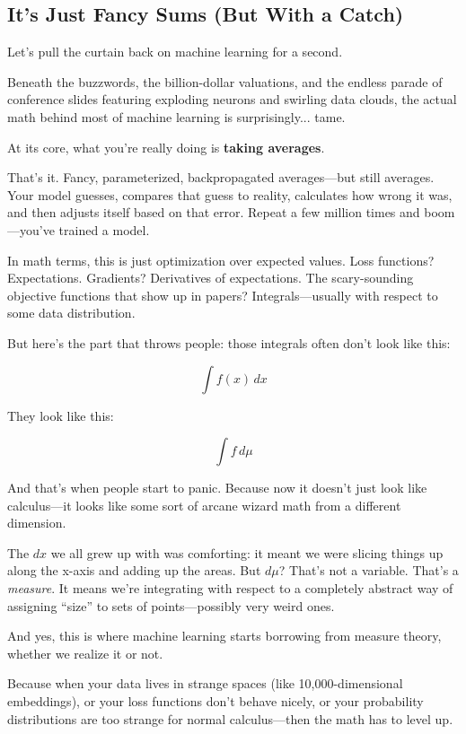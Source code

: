 \subsection{It’s Just Fancy Sums (But With a Catch)}

Let’s pull the curtain back on machine learning for a second.

Beneath the buzzwords, the billion-dollar valuations, and the endless parade of conference slides featuring exploding neurons and swirling data clouds, the actual math behind most of machine learning is surprisingly... tame.

At its core, what you’re really doing is \textbf{taking averages}.

That’s it. Fancy, parameterized, backpropagated averages—but still averages. Your model guesses, compares that guess to reality, calculates how wrong it was, and then adjusts itself based on that error. Repeat a few million times and boom—you’ve trained a model.

In math terms, this is just optimization over expected values. Loss functions? Expectations. Gradients? Derivatives of expectations. The scary-sounding objective functions that show up in papers? Integrals—usually with respect to some data distribution.

But here’s the part that throws people: those integrals often don’t look like this:

\[
\int f(x)\,dx
\]

They look like this:

\[
\int f \, d\mu
\]

And that’s when people start to panic. Because now it doesn’t just look like calculus—it looks like some sort of arcane wizard math from a different dimension.

The \( dx \) we all grew up with was comforting: it meant we were slicing things up along the x-axis and adding up the areas. But \( d\mu \)? That’s not a variable. That’s a \textit{measure}. It means we’re integrating with respect to a completely abstract way of assigning “size” to sets of points—possibly very weird ones.

And yes, this is where machine learning starts borrowing from measure theory, whether we realize it or not.

Because when your data lives in strange spaces (like 10,000-dimensional embeddings), or your loss functions don’t behave nicely, or your probability distributions are too strange for normal calculus—then the math has to level up.

